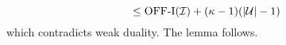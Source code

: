 {$$            \leq \mathrm{\mathrm{OFF}}\textrm{-}\mathrm{I}(\mathcal I)+(\kappa - 1)( |\mathcal U|-1)$$
        which contradicts weak duality. The lemma follows.
\hfill\Halmos

}
